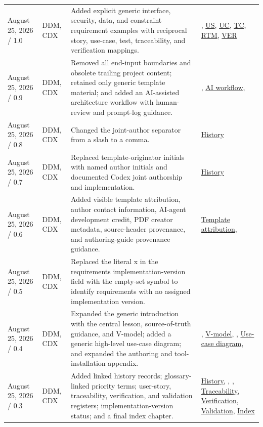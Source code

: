 \begin{tabularx}{\linewidth}{L{3.1cm}L{2.2cm}YL{2.0cm}}
August 25, 2026 / 1.0 & DDM, CDX & Added explicit generic interface, security, data, and constraint requirement examples with reciprocal story, use-case, test, traceability, and verification mappings. & , \hyperref[Table:UserStories]{US}, \hyperref[Chapter:UseCases]{UC}, \hyperref[Chapter:Tests]{TC}, \hyperref[Table:TraceabilityMatrix]{RTM}, \hyperref[Table:VerificationRegister]{VER}\\
August 25, 2026 / 0.9 & DDM, CDX & Removed all end-input boundaries and obsolete trailing project content; retained only generic template material; and added an AI-assisted architecture workflow with human-review and prompt-log guidance. & , \hyperref[Section:AIArchitectureWorkflow]{AI workflow}, \\
August 25, 2026 / 0.8 & DDM, CDX & Changed the joint-author separator from a slash to a comma. & \hyperref[Table:DocumentHistory]{History}\\
August 25, 2026 / 0.7 & DDM, CDX & Replaced template-originator initials with named author initials and documented Codex joint authorship and implementation. & \hyperref[Table:DocumentHistory]{History}\\
August 25, 2026 / 0.6 & DDM, CDX & Added visible template attribution, author contact information, AI-agent development credit, PDF creator metadata, source-header provenance, and authoring-guide provenance guidance. & \hyperref[Chapter:TemplateAttribution]{Template attribution}, \\
August 25, 2026 / 0.5 & DDM, CDX & Replaced the literal x in the requirements implementation-version field with the empty-set symbol to identify requirements with no assigned implementation version. & \\
August 25, 2026 / 0.4 & DDM, CDX & Expanded the generic introduction with the central lesson, source-of-truth guidance, and V-model; added a generic high-level use-case diagram; and expanded the authoring and tool-installation appendix. & , \hyperref[Figure:VModel]{V-model}, , \hyperref[Figure:UseCaseDiagram]{Use-case diagram}, \\
August 25, 2026 / 0.3 & DDM, CDX & Added linked history records; glossary-linked priority terms; user-story, traceability, verification, and validation registers; implementation-version status; and a final index chapter. & \hyperref[Table:DocumentHistory]{History}, , , \hyperref[Table:TraceabilityMatrix]{Traceability}, \hyperref[Table:VerificationRegister]{Verification}, \hyperref[Table:ValidationRegister]{Validation}, \hyperref[Chapter:Index]{Index}\\

\end{tabularx}
